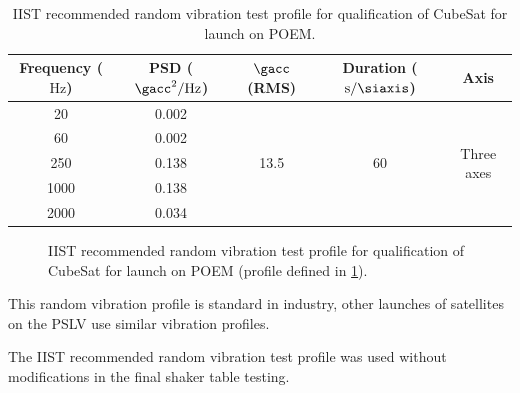 \documentclass[a4paper,11pt]{article}
\begin{document}
\begin{table}[t]
  \centering
  \begin{tabular}{|c | c | c | c | c|}
    \hline
    \textbf{Frequency ($\si{\hertz}$)} & \textbf{PSD ($\si{\square\gacc\per\hertz}$)} & \textbf{$\si{\gacc}$ (RMS)} & \textbf{Duration ($\si{\second\per\siaxis}$)} & \textbf{Axis}               \\ \hline
    20                                 & 0.002                                        & \multirow{5}{*}{13.5}       & \multirow{5}{*}{60}                           & \multirow{5}{*}{Three axes} \\ \cline{1-2}
    60                                 & 0.002                                        &                             &                                               &                             \\ \cline{1-2}
    250                                & 0.138                                        &                             &                                               &                             \\ \cline{1-2}
    1000                               & 0.138                                        &                             &                                               &                             \\ \cline{1-2}
    2000                               & 0.034                                        &                             &                                               &                             \\ \hline
  \end{tabular}
  \caption{IIST recommended random vibration test profile for qualification of CubeSat for launch on POEM.}
  \label{tabl:random-vibration-profile-iist}
\end{table}


\begin{figure}[b]
  \centering
  
  \label{fig:random-vibration-qualification-level}
  \caption{IIST recommended random vibration test profile for qualification of CubeSat for launch on POEM (profile defined in \ref{tabl:random-vibration-profile-iist}).}
\end{figure}

This random vibration profile is standard in industry, other launches of satellites on the PSLV use similar vibration profiles.

The IIST recommended random vibration test profile was used without modifications in the final shaker table testing.
\end{document}
